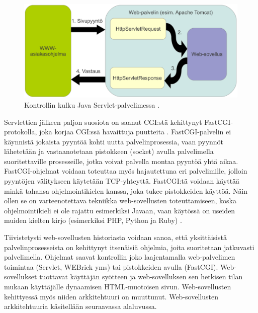 \begin{figure}[ht]
\centering
\includegraphics[width=\textwidth]{web/servlet.eps}
\caption{Kontrollin kulku Java Servlet-palvelimessa \cite{j2ee}.}%
\label{servlet}
\end{figure}
\pagebreak
Servlettien jälkeen paljon suosiota on saanut CGI:stä kehittynyt FastCGI-protokolla, joka korjaa CGI:ssä havaittuja puutteita \cite{fastcgi}. FastCGI-palvelin ei käynnistä jokaista pyyntöä kohti uutta palvelinprosessia, vaan pyynnöt lähetetään ja vas\-taan\-o\-te\-taan pistokkeen (socket) avulla palvelimella suoritettaville prosesseille, jotka voivat palvella montaa pyyntöä yhtä aikaa. FastCGI-ohjelmat voidaan toteuttaa myös hajautettuna eri palvelimille, jolloin pyyntöjen välitykseen käytetään TCP-yhteyttä. FastCGI:tä voidaan käyttää minkä tahansa ohjelmointikielen kanssa, joka tukee pistokkeiden käyttöä. Näin ollen se on varteenotettava tekniikka web-sovellusten toteuttamiseen, koska ohjelmointikieli ei ole rajattu esimerkiksi Javaan, vaan käytössä on useiden muiden kielten kirjo (esimerkiksi PHP, Python ja Ruby) \cite{fastcgi}.

Tiivistetysti web-sovellusten historiasta voidaan sanoa, että yksittäisistä palvelinprosesseista on kehittynyt itsenäisiä ohjelmia, joita suoritetaan jatkuvasti palvelimella. Ohjelmat saavat kontrollin joko laajentamalla web-pal\-ve\-li\-men toimintaa (Servlet, WEBrick yms) tai pistokkeiden avulla (FastCGI). Web-so\-vel\-luk\-set tuottavat käyttäjän syötteen ja web-sovelluksen sen hetkisen tilan mukaan käyttäjälle dynaamisen HTML-muotoisen sivun. Web-sovellusten kehittyessä myös niiden arkkitehtuuri on muuttunut. Web-sovellusten arkkitehtuuria käsitellään seuraavassa alaluvussa.